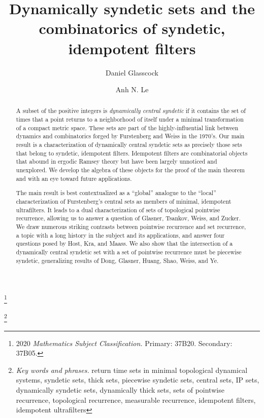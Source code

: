 \documentclass[letter,11pt]{article}
\newcommand\blfootnote[1]{%
  \begingroup
  \renewcommand\thefootnote{}\footnote{#1}%
  \addtocounter{footnote}{-1}%
  \endgroup
}
\theoremstyle{plain}
\theoremstyle{definition}
\theoremstyle{plain}
\theoremstyle{plain}
\numberwithin{equation}{section}
\begin{document}
\title{Dynamically syndetic sets and the combinatorics of syndetic, idempotent filters}

\author[1]{Daniel Glasscock}
\author[2]{Anh N. Le}


\date{}

\maketitle


\blfootnote{2020 \emph{Mathematics Subject Classification.}  Primary: 37B20. Secondary: 37B05.}


\blfootnote{\emph{Key words and phrases. }
return time sets in minimal topological dynamical systems,
syndetic sets,
thick sets,
piecewise syndetic sets,
central sets,
IP sets,
dynamically syndetic sets,
dynamically thick sets,
sets of pointwise recurrence,
topological recurrence,
measurable recurrence,
idempotent filters,
idempotent ultrafilters}


\begin{abstract}
A subset of the positive integers is \emph{dynamically central syndetic} if it contains the set of times that a point returns to a neighborhood of itself under a minimal transformation of a compact metric space.  These sets are part of the highly-influential link between dynamics and combinatorics forged by Furstenberg and Weiss in the 1970's.  Our main result is a characterization of dynamically central syndetic sets as precisely those sets that belong to syndetic, idempotent filters.
Idempotent filters are combinatorial objects that abound in ergodic Ramsey theory but have been largely unnoticed and unexplored.  We develop the algebra of these objects for the proof of the main theorem and with an eye toward future applications.

The main result is best contextualized as a ``global'' analogue to the ``local'' characterization of Furstenberg's central sets as members of minimal, idempotent ultrafilters.  It leads to a dual characterization of sets of topological pointwise recurrence, allowing us to answer a question of Glasner, Tsankov, Weiss, and Zucker.  We draw numerous striking contrasts between pointwise recurrence and set recurrence, a topic with a long history in the subject and its applications, and answer four questions posed by Host, Kra, and Maass. We also show that the intersection of a dynamically central syndetic set with a set of pointwise recurrence must be piecewise syndetic, generalizing results of Dong, Glasner, Huang, Shao, Weiss, and Ye.
\end{abstract}
\end{document}
